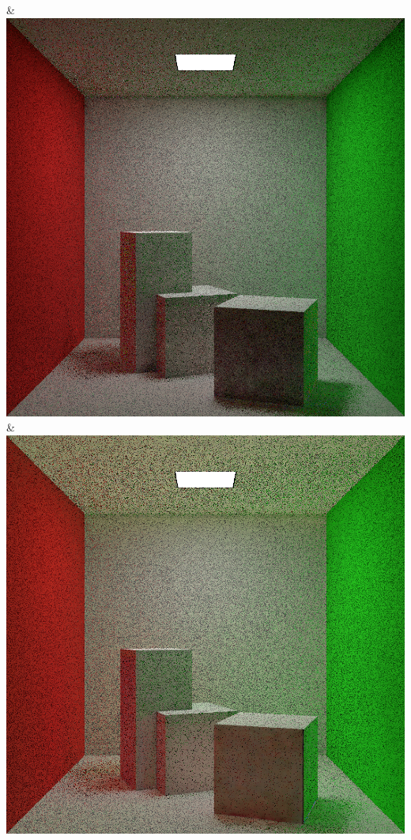 & \includegraphics[width=\linewidth]{figures/py/tests/quality_comparison/nrc+bt_1spp.png}
& \includegraphics[width=\linewidth]{figures/py/tests/quality_comparison/nrc+lt_1spp.png}
